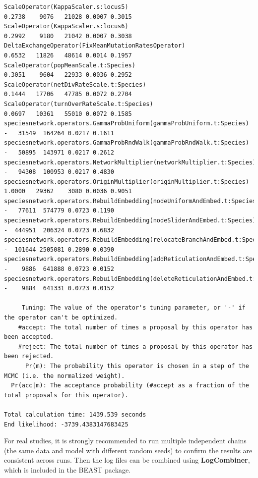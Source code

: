 \documentclass[11pt]{article}
\begin{document}
{\begin{verbatim}
ScaleOperator(KappaScaler.s:locus5)                                        0.2738    9076   21028 0.0007 0.3015 
ScaleOperator(KappaScaler.s:locus6)                                        0.2992    9180   21042 0.0007 0.3038 
DeltaExchangeOperator(FixMeanMutationRatesOperator)                        0.6532   11826   48614 0.0014 0.1957 
ScaleOperator(popMeanScale.t:Species)                                      0.3051    9604   22933 0.0036 0.2952 
ScaleOperator(netDivRateScale.t:Species)                                   0.1444   17706   47785 0.0072 0.2704 
ScaleOperator(turnOverRateScale.t:Species)                                 0.0697   10361   55010 0.0072 0.1585 
speciesnetwork.operators.GammaProbUniform(gammaProbUniform.t:Species)           -   31549  164264 0.0217 0.1611 
speciesnetwork.operators.GammaProbRndWalk(gammaProbRndWalk.t:Species)           -   50895  143971 0.0217 0.2612 
speciesnetwork.operators.NetworkMultiplier(networkMultiplier.t:Species)         -   94308  100953 0.0217 0.4830 
speciesnetwork.operators.OriginMultiplier(originMultiplier.t:Species)      1.0000   29362    3080 0.0036 0.9051 
speciesnetwork.operators.RebuildEmbedding(nodeUniformAndEmbed.t:Species)        -   77611  574779 0.0723 0.1190 
speciesnetwork.operators.RebuildEmbedding(nodeSliderAndEmbed.t:Species)         -  444951  206324 0.0723 0.6832 
speciesnetwork.operators.RebuildEmbedding(relocateBranchAndEmbed.t:Species)     -  101644 2505081 0.2890 0.0390 
speciesnetwork.operators.RebuildEmbedding(addReticulationAndEmbed.t:Species)    -    9886  641888 0.0723 0.0152 
speciesnetwork.operators.RebuildEmbedding(deleteReticulationAndEmbed.t:Species) -    9884  641331 0.0723 0.0152 

     Tuning: The value of the operator's tuning parameter, or '-' if the operator can't be optimized.
    #accept: The total number of times a proposal by this operator has been accepted.
    #reject: The total number of times a proposal by this operator has been rejected.
      Pr(m): The probability this operator is chosen in a step of the MCMC (i.e. the normalized weight).
  Pr(acc|m): The acceptance probability (#accept as a fraction of the total proposals for this operator).

Total calculation time: 1439.539 seconds
End likelihood: -3739.4383147683425
\end{verbatim}}

For real studies, it is strongly recommended to run multiple independent chains (the same data and model with different random seeds) to confirm the results are consistent across runs. Then the log files can be combined using \textbf{LogCombiner}, which is included in the BEAST package.
\end{document}
